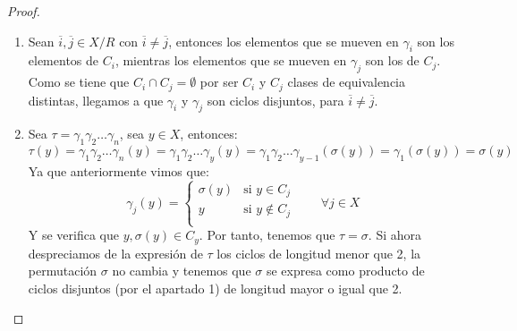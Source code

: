 \begin{teo}
\begin{proof}
        \begin{enumerate}
            \item Sean $\overline{i},\overline{j}\in X/R$ con $\overline{i}\neq \overline{j}$, entonces los elementos que se mueven en $\gamma_i$ son los elementos de $C_i$, mientras los elementos que se mueven en $\gamma_j$ son los de $C_j$. Como se tiene que $C_i\cap C_j = \emptyset $ por ser $C_i$ y $C_j$ clases de equivalencia distintas, llegamos a que $\gamma_i$ y $\gamma_j$ son ciclos disjuntos, para $\overline{i}\neq \overline{j}$.
            \item Sea $\tau = \gamma_1\gamma_2\ldots\gamma_n$, sea $y\in X$, entonces:
                \begin{equation*}
                    \tau(y) = \gamma_1\gamma_2\ldots\gamma_n(y) = \gamma_1\gamma_2\ldots\gamma_y(y) = \gamma_1\gamma_2\ldots\gamma_{y-1}(\sigma(y)) = \gamma_1(\sigma(y)) = \sigma(y)
                \end{equation*}
                Ya que anteriormente vimos que:
                \begin{equation*}
                    \gamma_j(y) = \left\{\begin{array}{cr}
                            \sigma(y) & \text{si\ } y\in C_j \\
                            y & \text{si\ } y\notin C_j \\
                    \end{array}\right. \qquad \forall j\in X
                \end{equation*}
                Y se verifica que $y,\sigma(y)\in C_y$. Por tanto, tenemos que $\tau = \sigma$. Si ahora despreciamos de la expresión de $\tau$ los ciclos de longitud menor que 2, la permutación $\sigma$ no cambia y tenemos que $\sigma$ se expresa como producto de ciclos disjuntos (por el apartado 1) de longitud mayor o igual que 2.\qedhere
        \end{enumerate}
    \end{proof}
\end{teo}

